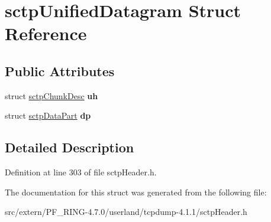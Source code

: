 \hypertarget{structsctp_unified_datagram}{
\section{sctpUnifiedDatagram Struct Reference}
\label{structsctp_unified_datagram}
}
\subsection*{Public Attributes}
\begin{DoxyCompactItemize}
\item 
\hypertarget{structsctp_unified_datagram_a48c1e180f7eee1d4e18a18f0d5d591b0}{
struct \hyperlink{structsctp_chunk_desc}{sctpChunkDesc} {\bfseries uh}}
\label{structsctp_unified_datagram_a48c1e180f7eee1d4e18a18f0d5d591b0}

\item 
\hypertarget{structsctp_unified_datagram_a98547cccae758ddbadb8dd217e3dc1da}{
struct \hyperlink{structsctp_data_part}{sctpDataPart} {\bfseries dp}}
\label{structsctp_unified_datagram_a98547cccae758ddbadb8dd217e3dc1da}

\end{DoxyCompactItemize}


\subsection{Detailed Description}


Definition at line 303 of file sctpHeader.h.



The documentation for this struct was generated from the following file:\begin{DoxyCompactItemize}
\item 
src/extern/PF\_\-RING-\/4.7.0/userland/tcpdump-\/4.1.1/sctpHeader.h\end{DoxyCompactItemize}
